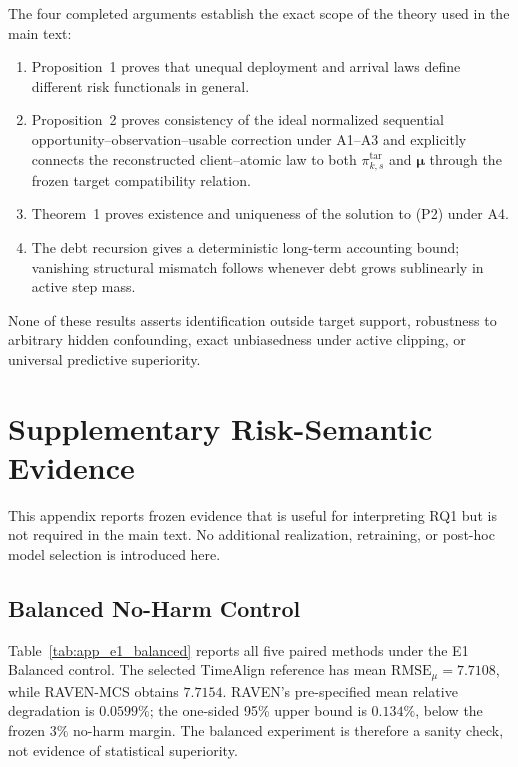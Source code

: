 \documentclass[letterpaper,journal]{IEEEtran}
\begin{document}
The four completed arguments establish the exact scope of the theory used in
the main text:

\begin{enumerate}
    \item Proposition~1 proves that unequal deployment and arrival laws define
    different risk functionals in general.
    \item Proposition~2 proves consistency of the ideal normalized sequential
    opportunity--observation--usable correction under A1--A3 and explicitly
    connects the reconstructed client--atomic law to both
    $\pi^{\mathrm{tar}}_{k,s}$ and $\boldsymbol\mu$ through the frozen target
    compatibility relation.
    \item Theorem~1 proves existence and uniqueness of the solution to (P2)
    under A4.
    \item The debt recursion gives a deterministic long-term accounting bound;
    vanishing structural mismatch follows whenever debt grows sublinearly in
    active step mass.
\end{enumerate}

None of these results asserts identification outside target support, robustness
to arbitrary hidden confounding, exact unbiasedness under active clipping, or
universal predictive superiority.




\section{Supplementary Risk-Semantic Evidence}
\label{app:risk_semantic_evidence}

This appendix reports frozen evidence that is useful for interpreting RQ1 but
is not required in the main text.  No additional realization, retraining, or
post-hoc model selection is introduced here.

\subsection{Balanced No-Harm Control}
\label{app:e1_balanced}

Table~\ref{tab:app_e1_balanced} reports all five paired methods under the E1
Balanced control.  The selected TimeAlign reference has mean
$\mathrm{RMSE}_\mu=7.7108$, while RAVEN-MCS obtains $7.7154$.  RAVEN's
pre-specified mean relative degradation is $0.0599\%$; the one-sided 95\%
upper bound is $0.134\%$, below the frozen $3\%$ no-harm margin.  The
balanced experiment is therefore a sanity check, not evidence of statistical
superiority.
\end{document}
